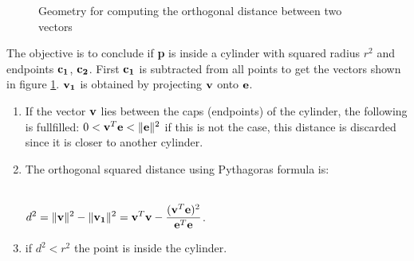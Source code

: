 \begin{figure}[H]
\centering
{}
\caption{Geometry for computing the orthogonal distance between two vectors}
\label{geometry}
\end{figure}

The objective is to conclude if {\bf p} is inside a cylinder with squared radius $r^2$ and endpoints ${\bf c_1}$, ${\bf c_2}$. First ${\bf c_1}$ is subtracted from all points to get the vectors shown in figure \ref{geometry}. $\bf v_1$ is obtained by projecting $\bf v$ onto $\bf e$.

\begin{enumerate}
\item If the vector $\bf v$ lies between the caps (endpoints) of the cylinder, the following is fullfilled: $ 0 < {\bf v}^T{\bf e} < \| {\bf e}\|^2$ if this is not the case, this distance is discarded since it is closer to another cylinder. 


\item The orthogonal squared distance using Pythagoras formula is:\\\\

\begin{center}
$\displaystyle d^2 = \|{\bf v}\|^2 - \|{\bf v_1}\|^2= {\bf v}^T{\bf v} -\frac{({\bf v}^T{\bf e})^2}{{\bf e}^T {\bf e}}$. 
\end{center}


\item if $d^2 < r^2$ the point is inside the cylinder.
\end{enumerate}

